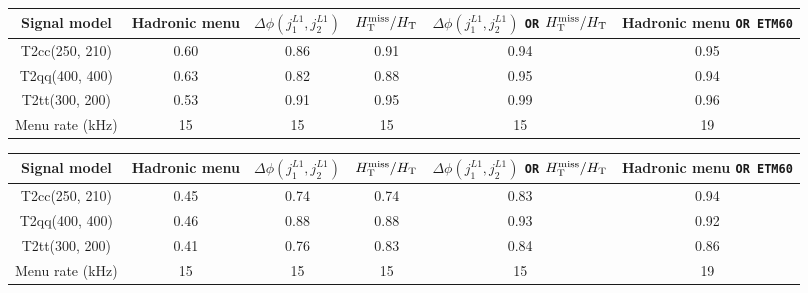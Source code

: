 \begin{table}[h!]
\footnotesize
\centering
\begin{tabular}{cccccc} 
\hline
\hline
  Signal model & Hadronic menu & $\Delta\phi(j_{1}^{L1},j_{2}^{L1})$ & $\mbox{$H_{\rm T}^{\rm miss}$}/\mbox{$H_\text{T}$}$ &$\Delta\phi(j_{1}^{L1},j_{2}^{L1})$ \verb!OR! $\mbox{$H_{\rm T}^{\rm miss}$}/\mbox{$H_\text{T}$}$ & Hadronic menu \verb!OR ETM60! \\
\hline
  T2cc(250, 210)   & 0.60 & 0.86 & 0.91 & 0.94 & 0.95 \\
  T2qq(400, 400)   & 0.63 & 0.82 & 0.88 & 0.95 & 0.94 \\
  T2tt(300, 200)   & 0.53 & 0.91 & 0.95 & 0.99 & 0.96 \\
\hline
  Menu rate (kHz) & 15   & 15   & 15   & 15   & 19   \\
\hline
\hline
\end{tabular}
\label{tab:LowHT_Seed_Signal_2Jet}
\end{table}

\begin{table}[h!]
\footnotesize
\centering
\begin{tabular}{cccccc} 
\hline
\hline
  Signal model & Hadronic menu & $\Delta\phi(j_{1}^{L1},j_{2}^{L1})$ & $\mbox{$H_{\rm T}^{\rm miss}$}/\mbox{$H_\text{T}$}$ &$\Delta\phi(j_{1}^{L1},j_{2}^{L1})$ \verb!OR! $\mbox{$H_{\rm T}^{\rm miss}$}/\mbox{$H_\text{T}$}$ & Hadronic menu \verb!OR ETM60! \\
\hline
  T2cc(250, 210)   & 0.45 & 0.74 & 0.74 & 0.83 & 0.94 \\
  T2qq(400, 400)   & 0.46 & 0.88 & 0.88 & 0.93 & 0.92 \\
  T2tt(300, 200)   & 0.41 & 0.76 & 0.83 & 0.84 & 0.86 \\
\hline
  Menu rate (kHz) & 15   & 15   & 15   & 15   & 19   \\
\hline
\hline
\end{tabular}
\label{tab:LowHT_Seed_Signal_3Jet}
\end{table}



